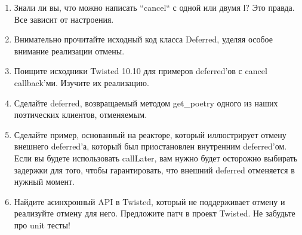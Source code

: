 \begin{enumerate}

\item Знали ли вы, что можно написать ``cancel`` с одной или двумя l? Это правда. Все 
    зависит от настроения.

\item Внимательно прочитайте исходный код класса Deferred, 
    уделяя особое внимание реализации отмены.

\item Поищите исходники Twisted 10.10 для примеров deferred'ов 
    с cancel callback'ми. Изучите их реализацию.

\item Сделайте deferred, возвращаемый методом get\_poetry одного из 
    наших поэтических клиентов, отменяемым.

\item Сделайте пример, основанный на реакторе, который иллюстрирует 
    отмену внешнего deferred'а, который был приостановлен внутренним 
    deferred'ом. Если вы будете использовать callLater, вам нужно будет 
    осторожно выбирать задержки для того, чтобы гарантировать, что 
    внешний deferred отменяется в нужный момент.

\item Найдите асинхронный API в Twisted, который не 
    поддерживает отмену и реализуйте отмену 
    для него. Предложите патч в проект Twisted. Не забудьте про unit тесты!

\end{enumerate}





